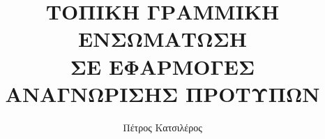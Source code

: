 \documentclass[a4paper,12pt,twoside]{report}
\begin{document}
\title{\LARGE {\bf ΤΟΠΙΚΗ ΓΡΑΜΜΙΚΗ ΕΝΣΩΜΑΤΩΣΗ \\ 
	    ΣΕ ΕΦΑΡΜΟΓΕΣ ΑΝΑΓΝΩΡΙΣΗΣ ΠΡΟΤΥΠΩΝ} \\
}

\author{Πέτρος Κατσιλέρος}

\maketitle

\preface






\cleardoublepage    
\tableofcontents

\cleardoublepage
\listoftables

\cleardoublepage
\listoffigures

\cleardoublepage










\medskip
\mbox{}




\nocite{8}
\nocite{9}
\nocite{10}
\nocite{11}
\nocite{12}
\nocite{13}
\nocite{14}
\end{document}
